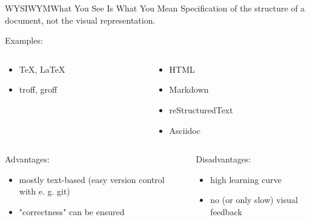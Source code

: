 \documentclass{setbeamer}
\begin{document}
\begin{frame}{WYSIWYM}{What You See Is What You Mean}
    Specification of the structure of a document, not the visual representation.

    \vspace{3mm}
    Examples:
    \begin{columns}
        \begin{column}{0.45\textwidth}
            \begin{itemize}
                \item \TeX{}, \LaTeX{}
                \item troff, groff
            \end{itemize}
        \end{column}

        \begin{column}{0.5\textwidth}
            \begin{itemize}
                \item HTML
                \item Markdown
                \item reStructuredText
                \item Asciidoc
            \end{itemize}
        \end{column}
    \end{columns}

    \vspace{5mm}
    \begin{columns}
        \begin{column}{0.45\textwidth}
            Advantages:
            \begin{itemize}
                \item mostly text-based (easy version control with e. g. git)
                \item "correctness" can be ensured
            \end{itemize}
        \end{column}

        \begin{column}{0.5\textwidth}
            Disadvantages:
            \begin{itemize}
                \item high learning curve
                \item no (or only slow) visual feedback
            \end{itemize}
        \end{column}
    \end{columns}
\end{frame}
\end{document}
